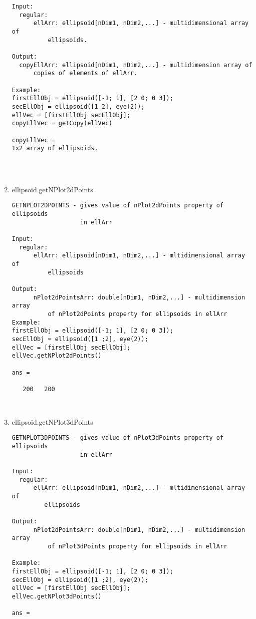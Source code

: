 \begin{enumerate}
\begin{lstlisting}
Input:
  regular:
      ellArr: ellipsoid[nDim1, nDim2,...] - multidimensional array of
          ellipsoids.

Output:
  copyEllArr: ellipsoid[nDim1, nDim2,...] - multidimension array of
      copies of elements of ellArr.

Example:
firstEllObj = ellipsoid([-1; 1], [2 0; 0 3]);
secEllObj = ellipsoid([1 2], eye(2));
ellVec = [firstEllObj secEllObj];
copyEllVec = getCopy(ellVec)

copyEllVec =
1x2 array of ellipsoids.




\end{lstlisting}
\fontfamily{\familydefault}
\selectfont
\item {ellipsoid.getNPlot2dPoints}
\selectfont
\begin{lstlisting}
GETNPLOT2DPOINTS - gives value of nPlot2dPoints property of ellipsoids
                   in ellArr

Input:
  regular:
      ellArr: ellipsoid[nDim1, nDim2,...] - mltidimensional array of
          ellipsoids

Output:
      nPlot2dPointsArr: double[nDim1, nDim2,...] - multidimension array
          of nPlot2dPoints property for ellipsoids in ellArr
Example:
firstEllObj = ellipsoid([-1; 1], [2 0; 0 3]);
secEllObj = ellipsoid([1 ;2], eye(2));
ellVec = [firstEllObj secEllObj];
ellVec.getNPlot2dPoints()

ans =

   200   200



\end{lstlisting}
\fontfamily{\familydefault}
\selectfont
\item {ellipsoid.getNPlot3dPoints}
\selectfont
\begin{lstlisting}
GETNPLOT3DPOINTS - gives value of nPlot3dPoints property of ellipsoids
                   in ellArr

Input:
  regular:
      ellArr: ellipsoid[nDim1, nDim2,...] - mltidimensional array  of
         ellipsoids

Output:
      nPlot2dPointsArr: double[nDim1, nDim2,...] - multidimension array
          of nPlot3dPoints property for ellipsoids in ellArr

Example:
firstEllObj = ellipsoid([-1; 1], [2 0; 0 3]);
secEllObj = ellipsoid([1 ;2], eye(2));
ellVec = [firstEllObj secEllObj];
ellVec.getNPlot3dPoints()

ans =


\end{lstlisting}
\end{enumerate}
